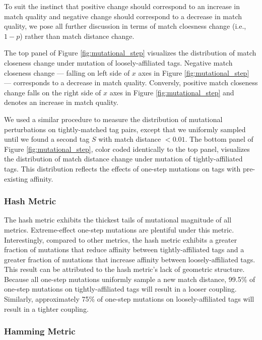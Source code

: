 To suit the instinct that positive change should correspond to an increase in match quality and negative change should correspond to a decrease in match quality, we pose all further discussion in terms of match cloesness change (i.e., $1 - p$) rather than match distance change.

The top panel of Figure \ref{fig:mutational_step} visualizes the distribution of match closeness change under mutation of loosely-affiliated tags.
Negative match closeness change --- falling on left side of $x$ axes in Figure \ref{fig:mutational_step} --- corresponds to a decrease in match quality.
Conversly, positive match closeness change falls on the right side of $x$ axes in Figure \ref{fig:mutational_step} and denotes an increase in match quality.

We used a similar procedure to measure the distribution of mutational perturbations on tightly-matched tag pairs, except that we uniformly sampled until we found a second tag $S$ with match distance $< 0.01$.
The bottom panel of Figure \ref{fig:mutational_step}, color coded identically to the top panel, visualizes the distribution of match distance change under mutation of tightly-affiliated tags.
This distribution reflects the effects of one-step mutations on tags with pre-existing affinity.

\subsubsection{Hash Metric}

The hash metric exhibits the thickest tails of mutational magnitude of all metrics.
Extreme-effect one-step mutations are plentiful under this metric.
Interestingly, compared to other metrics, the hash metric exhibits a greater fraction of mutations that reduce affinity between tightly-affiliated tags and a greater fraction of mutations that increase affinity between loosely-affiliated tags.
This result can be attributed to the hash metric's lack of geometric structure.
Because all one-step mutations uniformly sample a new match distance, 99.5\% of one-step mutations on tightly-affiliated tags will result in a looser coupling.
Similarly, approximately 75\% of one-step mutations on loosely-affiliated tags will result in a tighter coupling.

\subsubsection{Hamming Metric}

